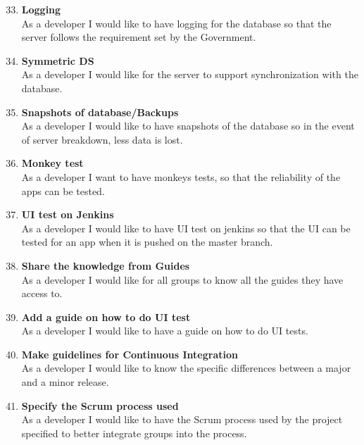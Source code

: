 \begin{enumerate}
	\setcounter{enumi}{32} %
	\item \textbf{Logging}\\
	As a developer I would like to have logging for the database so that the server follows the requirement set by the Government.
	
	\item \textbf{Symmetric DS}\\
	As a developer I would like for the server to support synchronization with the database.
	
	\item \textbf{Snapshots of database/Backups}\\
	As a developer I would like to have snapshots of the database so in the event of server breakdown, less data is lost.
	
	\item \textbf{Monkey test}\\
	As a developer I want to have monkeys tests, so that the reliability of the apps can be tested.
	
	\item \textbf{UI test on Jenkins}\\
	As a developer I would like to have UI test on jenkins so that the UI can be tested for an app when it is pushed on the master branch.
	
	\item \textbf{Share the knowledge from Guides}\\
	As a developer I would like for all groups to know all the guides they have access to.
	
	\item \textbf{Add a guide on how to do UI test}\\
	As a developer I would like to have a guide on how to do UI tests.
	
	\item \textbf{Make guidelines for Continuous Integration}\\
	As a developer I would like to know the specific differences between a major and a minor release.
	
	\item \textbf{Specify the Scrum process used}\\
	As a developer I would like to have the Scrum process used by the project specified to better integrate groups into the process.	
\end{enumerate}

